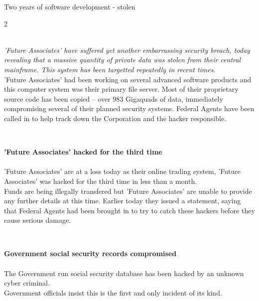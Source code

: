 

\LARGE{\centering \setmainfont{Sprawl} Two years of software development - stolen}

\begin{multicols}{2}

\small


\textbf{}~\\
\emph{'Future Associates' have suffered yet another embarrassing security breach, today revealing that a massive quantity of private data was stolen from their central mainframe. This system has been targetted repeatedly in recent times.}~\\
'Future Associates' had been working on several advanced software products and this computer system was their primary file server. Most of their proprietary source code has been copied -- over 983 Gigaquads of data, immediately compromising several of their planned security systems.
Federal Agents have been called in to help track down the Corporation and the hacker responsible.


\vfill~\vfill

\textbf{'Future Associates' hacked for the third time}~\\
\emph{}~\\
'Future Associates' are at a loss today as their online trading system, 'Future Associates' was hacked for the third time in less than a month.~\\


Funds are being illegally transfered but 'Future Associates' are unable to provide any further details at this time.
Earlier today they issued a statement, saying that Federal Agents had been brought in to try to catch these hackers before they cause serious damage. %

\vfill~\vfill

\textbf{Government social security records compromised}~\\
\emph{}~\\
The Government run social security database has been hacked by an unknown cyber criminal.~\\
Government officials insist this is the first and only incident of its kind.


\end{multicols}
